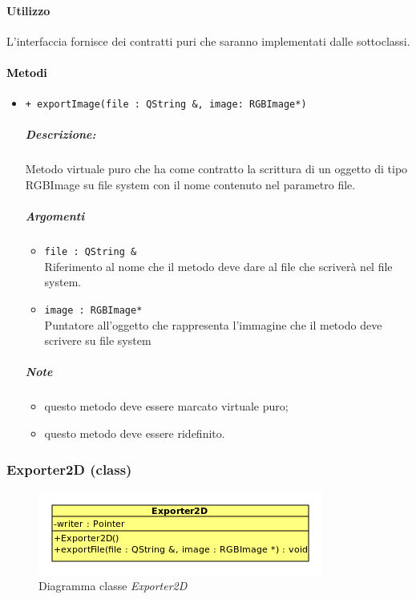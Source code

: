 \paragraph{Utilizzo\\}
L'interfaccia fornisce dei contratti puri che saranno implementati dalle sottoclassi.
\paragraph{\textcolor{black}{Metodi\\}}
	\begin{itemize}


		\item \color{blue}\verb!+ exportImage(file : QString &, image: RGBImage*)!
		\subparagraph{Descrizione:} Metodo virtuale puro che ha come contratto la scrittura di un oggetto di tipo RGBImage su file system con il nome contenuto nel parametro file.
\color{black}
		\subparagraph{Argomenti}
			\begin{itemize}
				\item \color{RoyalPurple}\verb!file : QString &! \\ 
				\color{black}Riferimento al nome che il metodo deve dare al file che scriverà nel file system.
				\item \color{RoyalPurple}\verb!image : RGBImage*! \\ 
				\color{black}Puntatore all'oggetto che rappresenta l'immagine che il metodo deve scrivere su file system
			\end{itemize}
\color{black}
		\subparagraph{Note}
			\begin{itemize}
				\item questo metodo deve essere marcato virtuale puro;
				\item questo metodo deve essere ridefinito.
			\end{itemize}
	\end{itemize}
		\color{black}

\pagebreak
\subsubsection{Exporter2D (class)}
\label{spexporter2d}
\begin{figure}[!h]
\centering
			\includegraphics[scale=5]{./Content/Immagini/model/Exporter2D.png}
			\caption{Diagramma classe \textsl{Exporter2D}}
			\label{cl_exporter2d}
\end{figure}

